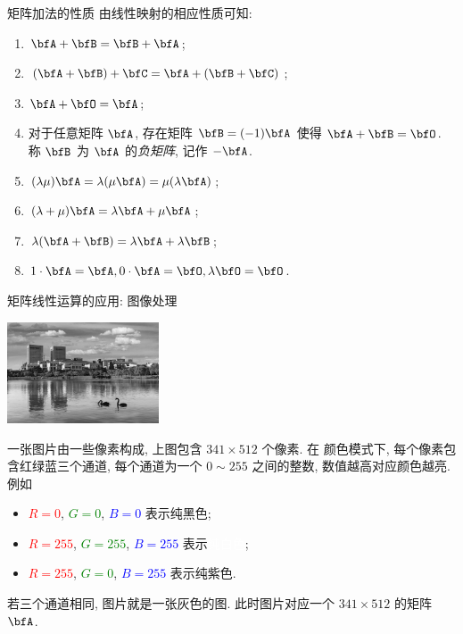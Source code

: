 \begin{frame}{矩阵加法的性质}
	\onslide<+->
	由线性映射的相应性质可知:
	\begin{enumerate}\bf
		\item $\bfA+\bfB=\bfB+\bfA$;
		\item $(\bfA+\bfB)+\bfC=\bfA+(\bfB+\bfC)$;
		\item $\bfA+\bfO=\bfA$;
		\item 对于任意矩阵 $\bfA$, 存在矩阵 $\bfB=(-1)\bfA$ 使得 $\bfA+\bfB=\bfO$. 称 $\bfB$ 为 $\bfA$ 的\emph{负矩阵}, 记作 $-\bfA$.
		\item $(\lambda \mu)\bfA=\lambda(\mu\bfA)=\mu(\lambda\bfA)$;
		\item $(\lambda+\mu)\bfA=\lambda\bfA+\mu\bfA$;
		\item $\lambda(\bfA+\bfB)=\lambda\bfA+\lambda\bfB$;
		\item $1\cdot \bfA=\bfA, 0\cdot\bfA=\bfO,\lambda\bfO=\bfO$.
	\end{enumerate}
\end{frame}


\begin{frame}{矩阵线性运算的应用: 图像处理\noexer}
	\onslide<+->
	\begin{center}
		\includegraphics[height=3cm]{../image/matrix2.jpg}
	\end{center}

	\onslide<+->
	一张图片由一些像素构成, 上图包含 $341\times512$ 个像素.
	\onslide<+->
	在  颜色模式下, 每个像素包含红绿蓝三个通道, 每个通道为一个 $0\sim255$ 之间的整数, 数值越高对应颜色越亮.
	\onslide<+->
	例如
	\begin{itemize}
		\item \textcolor{red}{$R=0$}, \textcolor{green}{$G=0$}, \textcolor{blue}{$B=0$} 表示纯黑色;
		\item \textcolor{red}{$R=255$}, \textcolor{green}{$G=255$}, \textcolor{blue}{$B=255$} 表示\colorbox[gray]{0.5}{\textcolor{white}{纯白色}};
		\item \textcolor{red}{$R=255$}, \textcolor{green}{$G=0$}, \textcolor{blue}{$B=255$} 表示\textcolor{-green}{纯紫色}.
	\end{itemize}
	\onslide<+->
	若三个通道相同, 图片就是一张灰色的图.
	此时图片对应一个 $341\times512$ 的矩阵 $\bfA$.
\end{frame}



